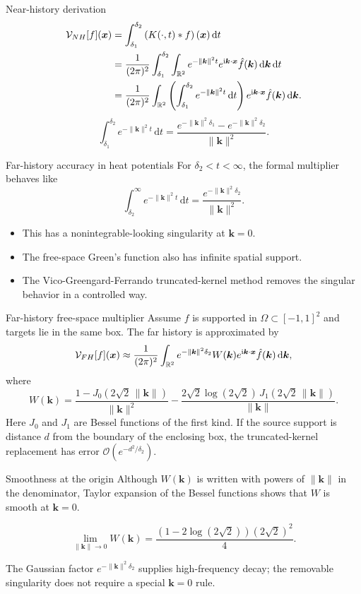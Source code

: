\documentclass[aspectratio=169,11pt]{beamer}
\newcommand{\R}{\mathbb{R}}
\newcommand{\cO}{\mathcal{O}}
\newcommand{\dd}{\,\mathrm d}
\newcommand{\ii}{\mathrm i}
\newcommand{\x}{\bm{x}}
\newcommand{\kvec}{\bm{k}}
\begin{document}
\begin{frame}{Near-history derivation}
\small
\[
\begin{aligned}
\Vop_{NH}[f](\x)
&=\int_{\delta_1}^{\delta_2}
  \left(K(\cdot,t)*f\right)(\x)\dd t\\
&=\frac{1}{(2\pi)^2}\int_{\delta_1}^{\delta_2}
  \int_{\R^2}
  e^{-\|\kvec\|^2t}
  e^{\ii\kvec\cdot\x}\hat f(\kvec)\dd\kvec\dd t\\
&=\frac{1}{(2\pi)^2}\int_{\R^2}
  \left(\int_{\delta_1}^{\delta_2}e^{-\|\kvec\|^2t}\dd t\right)
  e^{\ii\kvec\cdot\x}\hat f(\kvec)\dd\kvec.
\end{aligned}
\]
\[
  \int_{\delta_1}^{\delta_2}e^{-\|\kvec\|^2t}\dd t
  =
  \frac{e^{-\|\kvec\|^2\delta_1}-e^{-\|\kvec\|^2\delta_2}}
       {\|\kvec\|^2}.
\]
\end{frame}

\begin{frame}{Far-history accuracy in heat potentials}
\small
For $\delta_2<t<\infty$, the formal multiplier behaves like
\[
  \int_{\delta_2}^{\infty}e^{-\|\kvec\|^2t}\dd t
  =
  \frac{e^{-\|\kvec\|^2\delta_2}}{\|\kvec\|^2}.
\]

\begin{itemize}
  \item This has a nonintegrable-looking singularity at $\kvec=0$.
  \item The free-space Green's function also has infinite spatial support.
  \item The Vico-Greengard-Ferrando truncated-kernel method removes the singular
  behavior in a controlled way.
\end{itemize}
\end{frame}

\begin{frame}{Far-history free-space multiplier}
\small
Assume $f$ is supported in $\Omega\subset[-1,1]^2$ and targets lie in the
same box. The far history is approximated by
\[
  \Vop_{FH}[f](\x)
  \approx
  \frac{1}{(2\pi)^2}
  \int_{\R^2}
  e^{-\|\kvec\|^2\delta_2}
  W(\kvec)
  e^{\ii\kvec\cdot\x}\hat f(\kvec)\dd\kvec,
\]
where
\[
  W(\kvec)=
  \frac{1-J_0(2\sqrt2\,\|\kvec\|)}{\|\kvec\|^2}
  -
  \frac{2\sqrt2\log(2\sqrt2)\,J_1(2\sqrt2\,\|\kvec\|)}
       {\|\kvec\|}.
\]
Here $J_0$ and $J_1$ are Bessel functions of the first kind.
If the source support is distance $d$ from the boundary of the enclosing box,
the truncated-kernel replacement has error $\cO(e^{-d^2/\delta_2})$.
\end{frame}

\begin{frame}{Smoothness at the origin}
\small
Although $W(\kvec)$ is written with powers of $\|\kvec\|$ in the denominator,
Taylor expansion of the Bessel functions shows that $W$ is smooth at
$\kvec=0$.

\[
  \lim_{\|\kvec\|\to 0}W(\kvec)
  =
  \frac{(1-2\log(2\sqrt2))(2\sqrt2)^2}{4}.
\]

The Gaussian factor $e^{-\|\kvec\|^2\delta_2}$ supplies high-frequency
decay; the removable singularity does not require a special $\kvec=0$ rule.
\end{frame}
\end{document}
